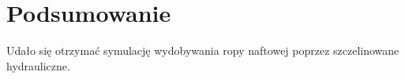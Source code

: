 \documentclass[onecolumn,12pt]{article}
\begin{document}
\section{Podsumowanie}
Udało się otrzymać symulację wydobywania ropy naftowej poprzez szczelinowane hydrauliczne.


\begin{thebibliography}{9}

\end{thebibliography}
\end{document}
